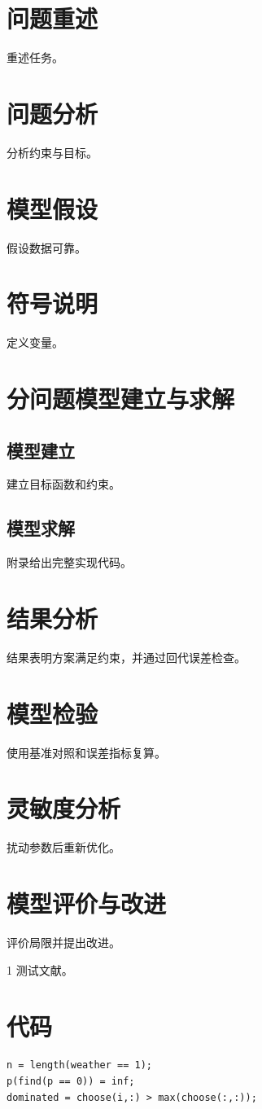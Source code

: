 \documentclass{ctexart}
\begin{document}
\begin{abstract}给出优化模型与检验结果。\end{abstract}
\section{问题重述}重述任务。
\section{问题分析}分析约束与目标。
\section{模型假设}假设数据可靠。
\section{符号说明}定义变量。
\section{分问题模型建立与求解}
\subsection{模型建立}建立目标函数和约束。
\subsection{模型求解}附录给出完整实现代码。
\section{结果分析}
结果表明方案满足约束，并通过回代误差检查。
\section{模型检验}使用基准对照和误差指标复算。
\section{灵敏度分析}扰动参数后重新优化。
\section{模型评价与改进}评价局限并提出改进。
\begin{thebibliography}{1} 测试文献。\end{thebibliography}
\appendix
\section{代码}
\begin{verbatim}
n = length(weather == 1);
p(find(p == 0)) = inf;
dominated = choose(i,:) > max(choose(:,:));
\end{verbatim}
\end{document}
